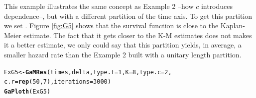 \documentclass[letterpaper]{article}\usepackage[]{graphicx}\usepackage[]{color}
\makeatletter
\newcommand{\hlnum}[1]{\textcolor[rgb]{0.686,0.059,0.569}{#1}}%
\newcommand{\hlstd}[1]{\textcolor[rgb]{0.345,0.345,0.345}{#1}}%
\newcommand{\hlkwb}[1]{\textcolor[rgb]{0.69,0.353,0.396}{#1}}%
\newcommand{\hlkwc}[1]{\textcolor[rgb]{0.333,0.667,0.333}{#1}}%
\newcommand{\hlkwd}[1]{\textcolor[rgb]{0.737,0.353,0.396}{\textbf{#1}}}%
\newenvironment{kframe}{%
 \def\at@end@of@kframe{}%
 \ifinner\ifhmode%
  \def\at@end@of@kframe{\end{minipage}}%
  \begin{minipage}{\columnwidth}%
 \fi\fi%
 \def\FrameCommand##1{\hskip\@totalleftmargin \hskip-\fboxsep
 \colorbox{shadecolor}{##1}\hskip-\fboxsep
     \hskip-\linewidth \hskip-\@totalleftmargin \hskip\columnwidth}%
 \MakeFramed {\advance\hsize-\width
   \@totalleftmargin\z@ \linewidth\hsize
   \@setminipage}}%
 {\par\unskip\endMakeFramed%
 \at@end@of@kframe}
\newenvironment{knitrout}{}{} %
\makeatother
\begin{document}
This example illustrates the same concept as Example 2 --how $c$ introduces dependence--, but with a different partition of the time axis. To get this partition we set . Figure \ref{fig:G5} shows that the survival function is close to the Kaplan-Meier estimate. The fact that it gets closer to the K-M estimates does not makes it a better estimate, we only could say that this partition yields, in average, a smaller hazard rate than the Example 2 built with a unitary length partition.

\begin{knitrout}
\color{fgcolor}\begin{kframe}
\begin{alltt}
\hlstd{ExG5} \hlkwb{<-} \hlkwd{GaMRes}\hlstd{(times, delta,} \hlkwc{type.t} \hlstd{=} \hlnum{1}\hlstd{,} \hlkwc{K} \hlstd{=} \hlnum{8}\hlstd{,} \hlkwc{type.c} \hlstd{=} \hlnum{2}\hlstd{,}
               \hlkwc{c.r} \hlstd{=} \hlkwd{rep}\hlstd{(}\hlnum{50}\hlstd{,} \hlnum{7}\hlstd{),} \hlkwc{iterations} \hlstd{=} \hlnum{3000}\hlstd{)}
\hlkwd{GaPloth}\hlstd{(ExG5)}
\end{alltt}
\end{kframe}
\end{knitrout}
\end{document}
